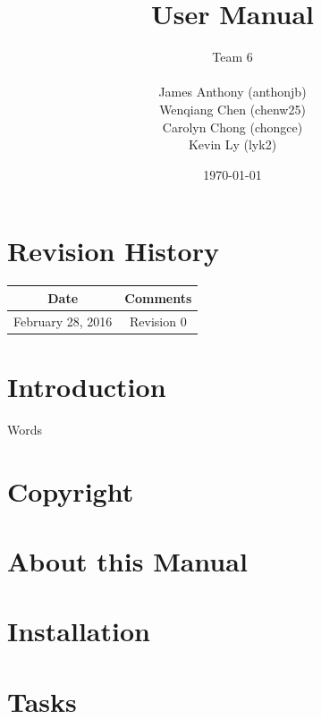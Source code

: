 \documentclass[12pt]{article}
\begin{document}
\title{User Manual}
\author{Team 6\\ \\James Anthony (anthonjb)\\ Wenqiang Chen (chenw25)\\ Carolyn Chong
(chongce)\\ Kevin Ly (lyk2)}
\date{\today}

\maketitle

\pagebreak

\tableofcontents
\listoffigures

\section*{Revision History}
\begin{tabular}{|c|c|}
\hline
\textbf{Date}  & \textbf{Comments} \\ \hline
February 28, 2016 & Revision 0 \\ \hline
\end{tabular}

\pagebreak


\section{Introduction}

Words

\section{Copyright}

\section{About this Manual}

\section{Installation}

\section{Tasks}
\end{document}
